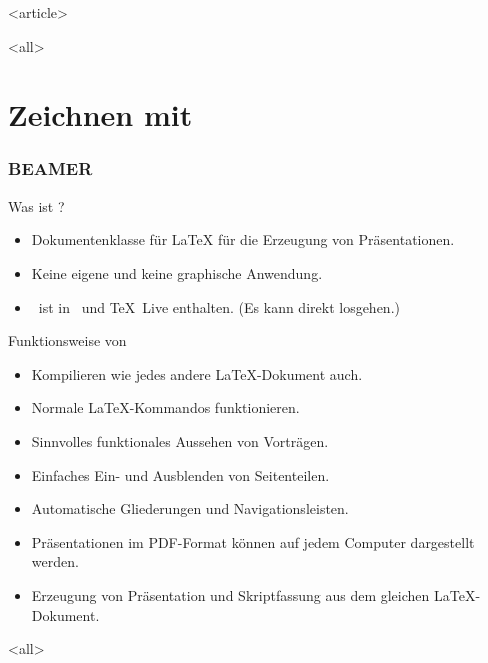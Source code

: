 \documentclass[xcolor=table]{beamer}
\begin{document}
\mode
<article>


\dominitoc
{}
\tableofcontents

\mode
<all>

\jonny

\label{chapter-tikz}
\setcounter{part}{1}
\chapter{Zeichnen mit \TikZ}

\website







\subsection{BEAMER}

\begin{Frame}{Was ist \beamer?}
  \begin{itemize}
    \item \alert{Dokumentenklasse für \LaTeX} für die Erzeugung von Präsentationen.
    \item Keine eigene und \alert{keine graphische Anwendung}.
    \item \strut\beamer\ ist in \MiKTeX\ und \TeX\ Live enthalten.\newline
      (\alert{Es kann direkt losgehen}.)
  \end{itemize}
\end{Frame}

\begin{Frame}{Funktionsweise von \beamer}
  \begin{itemize}
    \item Kompilieren wie jedes andere \LaTeX-Dokument auch.
    \item Normale \LaTeX-Kommandos funktionieren.
    \item Sinnvolles funktionales Aussehen von Vorträgen.
    \item Einfaches Ein- und Ausblenden von Seitenteilen.
    \item Automatische Gliederungen und Navigationsleisten.
    \item Präsentationen im PDF-Format können auf jedem Computer dargestellt werden.
    \item Erzeugung von Präsentation und Skriptfassung aus dem gleichen \LaTeX-Dokument.
  \end{itemize}
\end{Frame}

\mode
<all>

\website
\end{document}
